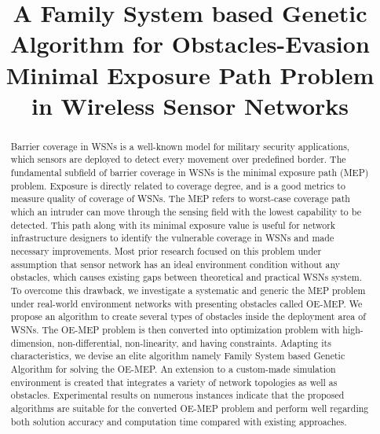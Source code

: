 \documentclass[final]{elsarticle}
\begin{document}
\begin{frontmatter}
\title{A Family System based Genetic Algorithm for Obstacles-Evasion Minimal Exposure Path Problem in Wireless Sensor Networks}

%
%
%
\begin{abstract}
Barrier coverage in WSNs is a well-known model for military security applications, which sensors are deployed to detect every movement over predefined border. The fundamental subfield of barrier coverage in WSNs is the minimal exposure path (MEP) problem. Exposure is directly related to coverage degree, and is a good metrics to measure quality of coverage of WSNs. The MEP refers to worst-case coverage path which an intruder can move through the sensing field with the lowest capability to be detected. This path along with its minimal exposure value is useful for network infrastructure designers to identify the vulnerable coverage in WSNs and made necessary improvements. Most prior research focused on this problem under assumption that sensor network has an ideal environment condition without any obstacles, which causes existing gaps between theoretical and practical WSNs system.  To overcome this drawback, we investigate a systematic and generic the MEP problem under real-world environment networks with presenting obstacles called OE-MEP. We propose an algorithm to create several types of obstacles inside the deployment area of WSNs. The OE-MEP problem is then converted into optimization problem with high-dimension, non-differential, non-linearity, and having constraints. Adapting its characteristics, we devise an elite algorithm namely Family System based Genetic Algorithm for solving the OE-MEP. An extension to a custom-made simulation environment is created that integrates a variety of network topologies as well as obstacles. Experimental results on numerous instances indicate that the proposed algorithms are suitable for the converted OE-MEP problem and perform well regarding both solution accuracy and computation time compared with existing approaches.
  

\end{abstract}
\end{frontmatter}
\end{document}
